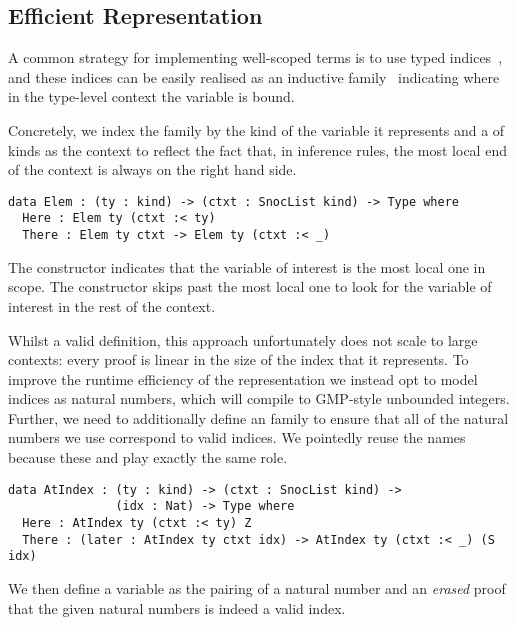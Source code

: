 \subsection{Efficient \DeBruijn{} Representation}
\label{sec:design:deBruijn}

A common strategy for implementing well-scoped terms is to use typed
\emph{\DeBruijn{}} indices~\cite{MANUAL:journals/math/debruijn72}, and these indices can be easily realised as an inductive family~\cite{DBLP:journals/fac/Dybjer94}
indicating where in the type-level context the variable is bound.

Concretely, we index the  family by the kind of the variable it represents and a  of kinds as the context to reflect the fact that,
in inference rules, the most local end of the context is always on the right hand side.

\begin{Verbatim}
data Elem : (ty : kind) -> (ctxt : SnocList kind) -> Type where
  Here : Elem ty (ctxt :< ty)
  There : Elem ty ctxt -> Elem ty (ctxt :< _)
\end{Verbatim}

The  constructor indicates that the variable of interest is
the most local one in scope.
%
The  constructor skips past the most local one to look for
the variable of interest in the rest of the context.

Whilst a valid definition, this approach unfortunately does not scale to
large contexts:
%
every  proof is linear in the size of the \DeBruijn{}
index that it represents.
%
To improve the runtime efficiency of the representation we instead opt to
model \DeBruijn{} indices as natural numbers, which \Idris{} will compile to
GMP-style unbounded integers.
%
Further, we need to additionally define an  family to ensure that
all of the natural numbers we use correspond to valid indices.
%
We pointedly reuse the  names because these 
and  play exactly the same role.

\begin{Verbatim}
data AtIndex : (ty : kind) -> (ctxt : SnocList kind) ->
               (idx : Nat) -> Type where
  Here : AtIndex ty (ctxt :< ty) Z
  There : (later : AtIndex ty ctxt idx) -> AtIndex ty (ctxt :< _) (S idx)
\end{Verbatim}

\noindent
We then define a variable as the pairing of a natural number and an \emph{erased}
proof that the given natural numbers is indeed a valid \DeBruijn{} index.

